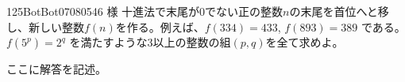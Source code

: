 \begin{prob}{125}{}{BotBot07080546 様}
 十進法で末尾が0でない正の整数$n$の末尾を首位へと移し、新しい整数$f(n)$を作る。例えば、$f(334)=433$, $f(893)=389$ である。$f(5^p)=2^q$ を満たすような3以上の整数の組$(p,q)$を全て求めよ。
\end{prob}
ここに解答を記述。